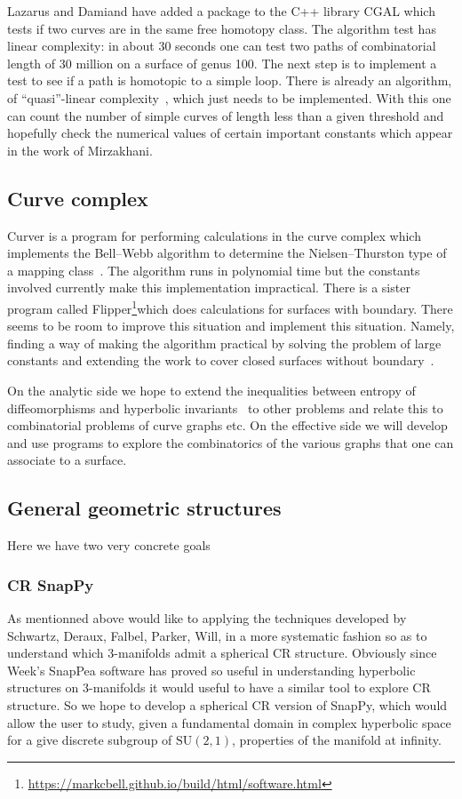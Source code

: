 \documentclass[14pt,fleqn]{article}
\begin{document}
Lazarus and Damiand have
added a package to the C++ library  CGAL which tests if two curves are
in the same free homotopy class. The algorithm test has linear
complexity: in about 30 seconds one can test two paths of
combinatorial length of 30 million on a surface of genus
100. The next step is to implement a test to see if a path
is homotopic to a simple loop. There is already an algorithm, of
“quasi”-linear complexity~\cite{dl-cginc-19}, which just needs to be implemented. With
this one can count the number of simple curves of length less than a given threshold 
and hopefully check the numerical values of certain important constants which
appear in the work of Mirzakhani.


\subsection{Curve complex}

Curver is a program for
performing calculations in the curve complex which implements the
Bell–Webb algorithm to determine the Nielsen–Thurston type of a
mapping class~\cite{b-c-17,b-esmt-19}. The algorithm runs in polynomial time but the constants
involved currently make this implementation impractical. There is a
sister program called Flipper\footnote{\url{https://markcbell.github.io/build/html/software.html}}which does calculations for surfaces
with boundary. There seems to be room to improve this situation and
implement this situation. Namely, finding a way of making the
algorithm practical by solving the problem of large constants and
extending the work to cover closed surfaces without boundary~\cite{mm-sosr-19}.

On the analytic side we hope to extend the
inequalities between entropy of diffeomorphisms and hyperbolic
invariants~\cite{km-nevvp-18} to other problems and relate this to combinatorial problems
of curve graphs etc. On the effective side we will develop and use
programs to explore the combinatorics of the various graphs that one
can associate to a surface.

\subsection{General geometric structures}

Here we have two very concrete goals

\subsubsection{CR SnapPy}
As mentionned above would like to applying the  techniques developed 
by Schwartz, Deraux, Falbel, Parker, Will, in a
more systematic fashion so as to understand
which 3-manifolds admit a spherical CR structure.
Obviously since Week's SnapPea software 
has proved so useful in understanding 
hyperbolic structures on 3-manifolds
it would useful to have a similar tool
to explore CR structure.
So we hope to develop a spherical CR version of SnapPy,
which would allow the user to study, 
given a fundamental domain 
in complex hyperbolic space  for a
give discrete subgroup of $\mathrm{SU}(2,1)$, properties of the  manifold at infinity.
\end{document}
